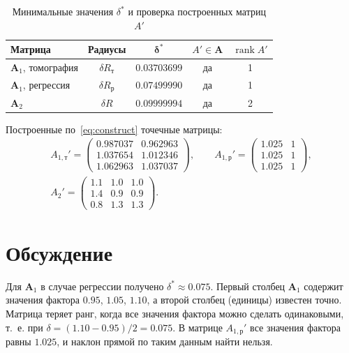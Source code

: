 \documentclass[a4paper, 14pt]{extarticle}
\begin{document}
\begin{table}[H]
    \centering
    \caption{Минимальные значения $\delta^*$ и проверка построенных матриц $A'$}
    \label{tab:delta}
    \begin{tabular}{|l|c|c|c|c|}
        \hline
        \textbf{Матрица} & \textbf{Радиусы} & $\boldsymbol{\delta^*}$ & $A' \in \mathbf{A}$ & $\operatorname{rank} A'$ \\ \hline
        $\mathbf{A}_1$, томография & $\delta R_\text{т}$ & $0.03703699$ & да & 1 \\ \hline
        $\mathbf{A}_1$, регрессия  & $\delta R_\text{р}$ & $0.07499990$ & да & 1 \\ \hline
        $\mathbf{A}_2$             & $\delta R$         & $0.09999994$ & да & 2 \\ \hline
    \end{tabular}
\end{table}

Построенные по~\eqref{eq:construct} точечные матрицы:
\begin{gather*}
    A_{1,\text{т}}' =
    \begin{pmatrix}
        0.987037 & 0.962963\\
        1.037654 & 1.012346\\
        1.062963 & 1.037037
    \end{pmatrix},\qquad
    A_{1,\text{р}}' =
    \begin{pmatrix}
        1.025 & 1\\
        1.025 & 1\\
        1.025 & 1
    \end{pmatrix},\\
    A_2' =
    \begin{pmatrix}
        1.1 & 1.0 & 1.0\\
        1.4 & 0.9 & 0.9\\
        0.8 & 1.3 & 1.3
    \end{pmatrix}.
\end{gather*}

\section{Обсуждение}

Для $\mathbf{A}_1$ в случае регрессии получено $\delta^* \approx 0.075$. Первый столбец $\mathbf{A}_1$ содержит значения фактора $0.95$, $1.05$, $1.10$, а второй столбец (единицы) известен точно. Матрица теряет ранг, когда все значения фактора можно сделать одинаковыми, т.~е. при $\delta = (1.10 - 0.95)/2 = 0.075$. В матрице $A_{1,\text{р}}'$ все значения фактора равны $1.025$, и наклон прямой по таким данным найти нельзя.
\end{document}
